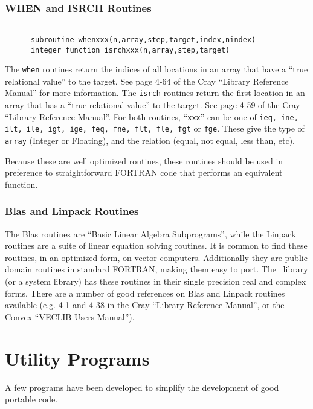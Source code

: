 \documentclass{report}
\begin{document}
\subsection{WHEN and ISRCH Routines}
\begin{verbatim}

      subroutine whenxxx(n,array,step,target,index,nindex)
      integer function isrchxxx(n,array,step,target)

\end{verbatim}
The {\tt when} routines return the indices of all locations in an array that
have a ``true relational value'' to the target. See page 4-64 of the
Cray ``Library Reference Manual'' for more information. The {\tt isrch}
routines return the first location in an array that has a ``true
relational value'' to the target. See page 4-59 of the Cray ``Library
Reference Manual''. For both routines, ``{\tt xxx}'' can be one of
{\tt ieq, ine, ilt, ile, igt, ige, feq, fne, flt, fle, fgt} or {\tt fge}.
These give the type of {\tt array} (Integer or Floating), and the relation
(equal, not equal, less than, etc).

Because these are well optimized routines, these routines should be used in
preference to straightforward FORTRAN
code that performs an equivalent function.

\subsection{Blas and Linpack Routines}
The Blas routines are ``Basic Linear Algebra Subprograms'', while the
Linpack routines are a suite of linear equation solving routines. It is
common to find these routines, in an optimized form, on vector computers.
Additionally they are public domain routines in standard FORTRAN, making them
easy to port. The \miriad\ library (or a system library) has
these routines in their single precision real and complex forms.
There are a number of good references on Blas and Linpack routines
available (e.g. 4-1 and 4-38 in the Cray ``Library Reference Manual'',
or the Convex ``VECLIB Users Manual'').

\newchapter
\chapter{Utility Programs}\label{ch:utilities}
A few programs have been developed to simplify the development of good
portable code.
\end{document}
